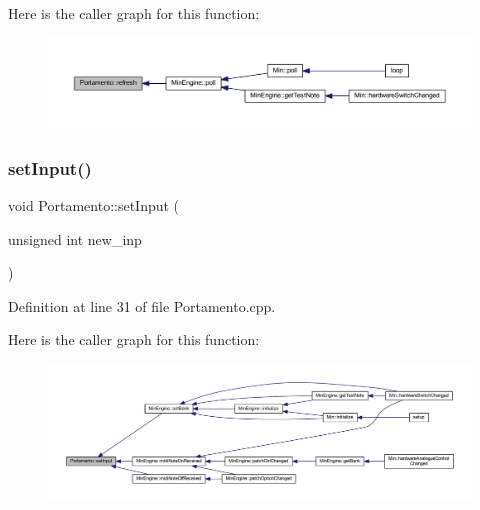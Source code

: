 Here is the caller graph for this function\+:
\nopagebreak
\begin{figure}[H]
\begin{center}
\leavevmode
\includegraphics[width=350pt]{class_portamento_a4a5430c4e0561f9b37bbffdcbb936c43_icgraph}
\end{center}
\end{figure}
\mbox{\label{class_portamento_aa03a209b228dd0335cf103f1614d219a}} 
\subsubsection{\texorpdfstring{set\+Input()}{setInput()}}
{\footnotesize\ttfamily void Portamento\+::set\+Input (\begin{DoxyParamCaption}\item[{unsigned int}]{new\+\_\+inp }\end{DoxyParamCaption})}



Definition at line 31 of file Portamento.\+cpp.

Here is the caller graph for this function\+:
\nopagebreak
\begin{figure}[H]
\begin{center}
\leavevmode
\includegraphics[width=350pt]{class_portamento_aa03a209b228dd0335cf103f1614d219a_icgraph}
\end{center}
\end{figure}
\mbox{\label{class_portamento_aa28dcb234093a065e0970185eb107c78}} 
